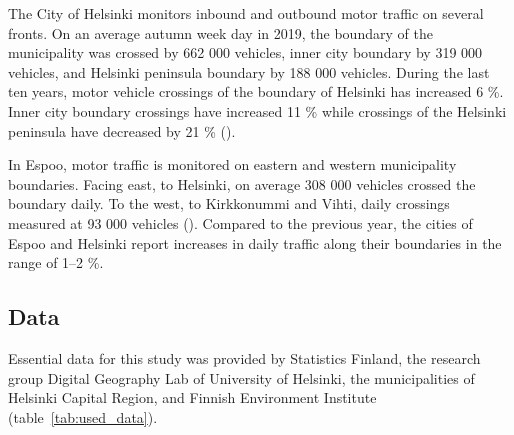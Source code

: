 The City of Helsinki monitors inbound and outbound motor traffic on several fronts. On an average autumn week day in 2019, the boundary of the municipality was crossed by 662 000 vehicles, inner city boundary by 319 000 vehicles, and Helsinki peninsula boundary by 188 000 vehicles. During the last ten years, motor vehicle crossings of the boundary of Helsinki has increased 6 \%. Inner city boundary crossings have increased 11 \% while crossings of the Helsinki peninsula have decreased by 21 \% (\cite{CityofHelsinki2019}).

In Espoo, motor traffic is monitored on eastern and western municipality boundaries. Facing east, to Helsinki, on average 308 000 vehicles crossed the boundary daily. To the west, to Kirkkonummi and Vihti, daily crossings measured at 93 000 vehicles (\cite{Espoonkaup2020}). Compared to the previous year, the cities of Espoo and Helsinki report increases in daily traffic along their boundaries in the range of 1--2 \%.

\subsection{Data}
\justify

Essential data for this study was provided by Statistics Finland, the research group Digital Geography Lab of University of Helsinki, the municipalities of Helsinki Capital Region, and Finnish Environment Institute (table~\ref{tab:used_data}).


